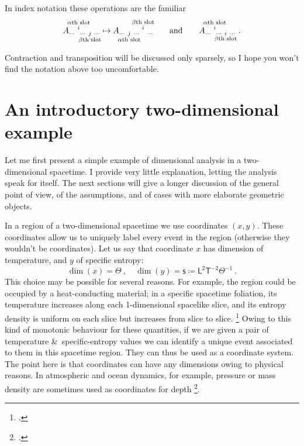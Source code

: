 \documentclass[\ifafour a4paper,12pt,\else a5paper,10pt,\fi%
onecolumn,oneside,article,%
british%
]{memoir}
\makeatletter
\theoremstyle{remark}
\theoremstyle{innote}
\newcommand*{\mathte}[1]{\textbf{\textit{\textsf{#1}}}}
\newcommand*{\citep}{\footcites}
\newcommand*{\amp}{\&}
\newcommand*{\defd}{\coloneqq}
\renewcommand*{\|}[1][]{\nonscript\,#1\vert\nonscript\;\mathopen{}}
\newcommand*{\sect}{\S}%
\newcommand*{\chap}{ch.}%
\newcommand*{\eg}{{e.g.}}
\newcommand*{\q}{}%
\DeclareRobustCommand*{\q}{%
  \mathbin{\mathpalette\bigcdot@{}}%
}
\newcommand*{\bigcdot@scalefactor}{0.7}
\newcommand*{\bigcdot@widthfactor}{1.5}
\newcommand*{\bigcdot@}[2]{%
  \sbox0{$#1\vcenter{}$}%
  \sbox2{$#1\cdot\m@th$}%
  \hbox to \bigcdot@widthfactor\wd2{%
    \hfil
    \raise\ht0\hbox{%
      \scalebox{\bigcdot@scalefactor}{%
        \lower\ht0\hbox{$#1\bullet\m@th$}%
      }%
    }%
    \hfil
  }%
}
\newcommand*{\Le}{\textsf{L}}
\newcommand*{\Ti}{\textsf{T}}
\newcommand*{\Te}{\Theta}
\newcommand*{\Ent}{\textsf{s}}
\newcommand*{\yA}{\mathte{A}}
\renewcommand*{\i}{\indices}
\makeatother
\begin{document}
In index notation these operations are the familiar
\begin{equation*}
  A\i{_{\dotsm\ }^{%
      \overset{\mathclap{\scriptstyle\text{$\alpha$th slot}}}{i}
    }_{\dotsm\ %
      \underset{\mathclap{\scriptstyle\text{$\beta$th slot}}}{j}
      \ \dotsm}}
  \mapsto
  A\i{_{\dotsm\ %
      \underset{\mathclap{\scriptstyle\text{$\alpha$th slot}}}{j}
      \ \dotsm\ }^{%
      \overset{\mathclap{\scriptstyle\text{$\beta$th slot}}}{i}
    }_{\ \dotsm}} 
  \qquad\text{and}\qquad
  A\i{_{\dotsm\ }^{%
      \overset{\mathclap{\scriptstyle\text{$\alpha$th slot}}}{i}
    }_{\dotsm\ %
      \underset{\mathclap{\scriptstyle\text{$\beta$th slot}}}{i}
      \ \dotsm}} \ .
\end{equation*}

Contraction and transposition will be discussed only sparsely, so I hope
you won't find the notation above too uncomfortable.





\section{An introductory two-dimensional example}
\label{sec:2d_example}

Let me first present a simple example of dimensional analysis in a
two-dimensional spacetime. I provide very little explanation, letting the
analysis speak for itself. The next sections will give a longer discussion
of the general point of view, of the assumptions, and of cases with more
elaborate geometric objects.

In a region of a two-dimensional spacetime we use coordinates $(x,y)$.
These coordinates allow us to uniquely label every event in the region
(otherwise they wouldn't be coordinates). Let us say that coordinate $x$
has dimension of temperature, and $y$ of specific entropy:
\begin{equation}
  \label{eq:example_coords2d}
  \dim(x)=\Te \ ,\quad
  \dim(y)= \Ent \defd \Le^{2}\Ti^{-2}\Te^{-1} \ .
\end{equation}
This choice may be possible for several reasons. For example, the region
could be occupied by a heat-conducting material; in a specific spacetime
foliation, its temperature increases along each 1-dimensional spacelike
slice, and its entropy density is uniform on each slice but increases from
slice to slice. \citep[For general-relativistic thermomechanics see
\eg][]{eckart1940c,maugin1974b,maugin1978b,maugin1978c,maugin1978d,maugin1978e,muschiketal2014}
Owing to this kind of monotonic behaviour for these quantities, if we are
given a pair of temperature \amp\ specific-entropy values we can identify a
unique event associated to them in this spacetime region. They can thus be
used as a coordinate system. The point here is that coordinates can have
any dimensions owing to physical reasons. In atmospheric and ocean
dynamics, for example, pressure or mass density are sometimes used as
coordinates for depth
\citep[\chap~6]{griffies2004}[\sect~2.6.2]{vallis2006}.
\end{document}
